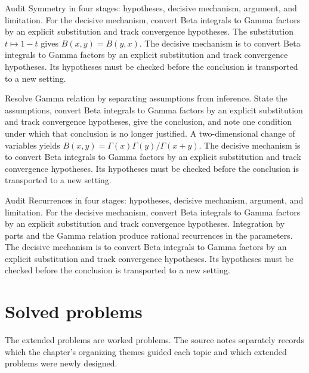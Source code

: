 \begin{example}\label{ex:iv20-worked-02}
Audit Symmetry in four stages: hypotheses, decisive mechanism, argument, and limitation. For the decisive mechanism, convert Beta integrals to Gamma factors by an explicit substitution and track convergence hypotheses. The substitution $t\mapsto1-t$ gives $B(x,y)=B(y,x)$. The decisive mechanism is to convert Beta integrals to Gamma factors by an explicit substitution and track convergence hypotheses. Its hypotheses must be checked before the conclusion is transported to a new setting.
\end{example}

\begin{example}\label{ex:iv20-worked-03}
Resolve Gamma relation by separating assumptions from inference. State the assumptions, convert Beta integrals to Gamma factors by an explicit substitution and track convergence hypotheses, give the conclusion, and note one condition under which that conclusion is no longer justified. A two-dimensional change of variables yields $B(x,y)=\Gamma(x)\Gamma(y)/\Gamma(x+y)$. The decisive mechanism is to convert Beta integrals to Gamma factors by an explicit substitution and track convergence hypotheses. Its hypotheses must be checked before the conclusion is transported to a new setting.
\end{example}

\begin{example}\label{ex:iv20-worked-04}
Audit Recurrences in four stages: hypotheses, decisive mechanism, argument, and limitation. For the decisive mechanism, convert Beta integrals to Gamma factors by an explicit substitution and track convergence hypotheses. Integration by parts and the Gamma relation produce rational recurrences in the parameters. The decisive mechanism is to convert Beta integrals to Gamma factors by an explicit substitution and track convergence hypotheses. Its hypotheses must be checked before the conclusion is transported to a new setting.
\end{example}

\section{Solved problems}
The extended problems are worked problems. The source notes separately records which the chapter's organizing themes guided each topic and which extended problems were newly designed.

